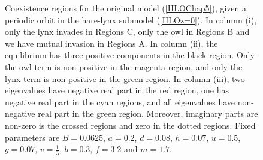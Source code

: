 \documentclass[12pt]{UOthesis}
\theoremstyle{remarkstyle}
\begin{document}
\begin{figure}[h!]
	\centering
	
	\caption[Regions for the original model (periodic orbit)]{Coexistence regions for the original model (\ref{HLOChap5}), given a periodic orbit in the hare-lynx submodel (\ref{HLOz=0}). In column (i), only the lynx invades in Regions C, only the owl in Regions B and we have mutual invasion in Regions A. In column (ii), the equilibrium has three positive components in the black region. Only the owl term is non-positive in the magenta region, and only the lynx term is non-positive in the green region. In column (iii), two eigenvalues have negative real part in the red region, one has negative real part in the cyan regions, and all eigenvalues have non-negative real part in the green region. Moreover, imaginary parts are non-zero is the crossed regions and zero in the dotted regions. Fixed parameters are $B=0.0625$, $a=0.2$, $d=0.08$, $h=0.07$, $u=0.5$, $g=0.07$, $v=\frac{1}{3}$, $b=0.3$, $f=3.2$ and $m=1.7$.\label{HLOPORegions}}%
\end{figure}
\end{document}
